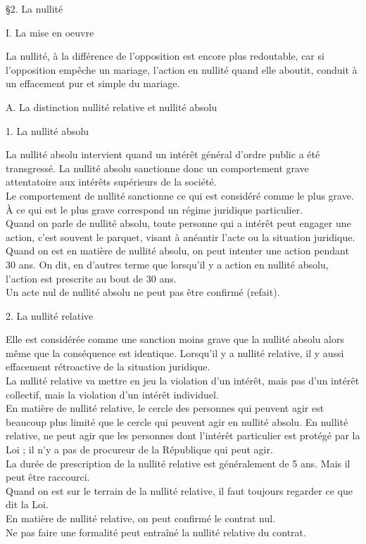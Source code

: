 \documentclass[12pt, a4paper, openany]{book}
\begin{document}
§2. La nullité


I. La mise en oeuvre


La nullité, à la différence de l'opposition est encore plus redoutable, car si l'opposition empêche un mariage, l'action en nullité quand elle aboutit, conduit à un effacement pur et simple du mariage. 


A. La distinction nullité relative et nullité absolu


1. La nullité absolu


La nullité absolu intervient quand un intérêt général d'ordre public a été transgressé. La nullité absolu sanctionne donc un comportement grave attentatoire aux intérêts supérieurs de la société. \\
Le comportement de nullité sanctionne ce qui est considéré comme le plus grave. À ce qui est le plus grave correspond un régime juridique particulier. \\
Quand on parle de nullité absolu, toute personne qui a intérêt peut engager une action, c'est souvent le parquet, visant à anéantir l'acte ou la situation juridique. \\
Quand on est en matière de nullité absolu, on peut intenter une action pendant 30 ans. On dit, en d'autres terme que lorsqu'il y a action en nullité absolu, l'action est prescrite au bout de 30 ans. \\
Un acte nul de nullité absolu ne peut pas être confirmé (refait). 


2. La nullité relative


Elle est considérée comme une sanction moins grave que la nullité absolu alors même que la conséquence est identique. Lorsqu'il y a nullité relative, il y aussi effacement rétroactive de la situation juridique. \\
La nullité relative va mettre en jeu la violation d'un intérêt, mais pas d'un intérêt collectif, mais la violation d'un intérêt individuel. \\
En matière de nullité relative, le cercle des personnes qui peuvent agir est beaucoup plus limité que le cercle qui peuvent agir en nullité absolu. En nullité relative, ne peut agir que les personnes dont l'intérêt particulier est protégé par la Loi ; il n'y a pas de procureur de la République qui peut agir. \\
La durée de prescription de la nullité relative est généralement de 5 ans. Mais il peut être raccourci. \\
Quand on est sur le terrain de la nullité relative, il faut toujours regarder ce que dit la Loi. \\
En matière de nullité relative, on peut confirmé le contrat nul. \\
Ne pas faire une formalité peut entraîné la nullité relative du contrat.
\end{document}
